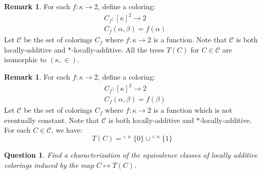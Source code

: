 \documentclass[11pt]{amsart}
\theoremstyle{plain}
\newtheorem{question}[theorem]{Question}
\theoremstyle{definition} %
\newtheorem{remark}[theorem]{Remark}
\theoremstyle{remark}
\begin{document}
\begin{remark}
For each $f:\kappa \to 2$, define a coloring:
\begin{align*}
&C_f:[\kappa]^2 \to 2\\
&C_f(\alpha,\beta)=f(\alpha)
\end{align*}
Let $\mathcal{C}$ be the set of colorings $C_f$ where $f:\kappa \to 2$ is a function. Note that $\mathcal{C}$ is both locally-additive and $*$-locally-additive. All the trees $T(C)$ for $C \in \mathcal{C}$ are isomorphic to $(\kappa,\in)$.
\end{remark}


\begin{remark}
For each $f:\kappa \to 2$, define a coloring:
\begin{align*}
&C_f:[\kappa]^2 \to 2\\
&C_f(\alpha,\beta)=f(\beta)
\end{align*}
Let $\mathcal{C}$ be the set of colorings $C_f$ where $f:\kappa \to 2$ is a function which is not eventually constant. Note that $\mathcal{C}$ is both locally-additive and $*$-locally-additive. For each $C \in \mathcal{C}$, we have:
\[
T(C)=^{<\kappa}\{0\} \cup ^{<\kappa}\{1\}
\]
\end{remark}


\begin{question}
Find a characterization of the equivalence classes of locally additive colorings induced by the map $C \mapsto T(C)$.
\end{question}
\end{document}
